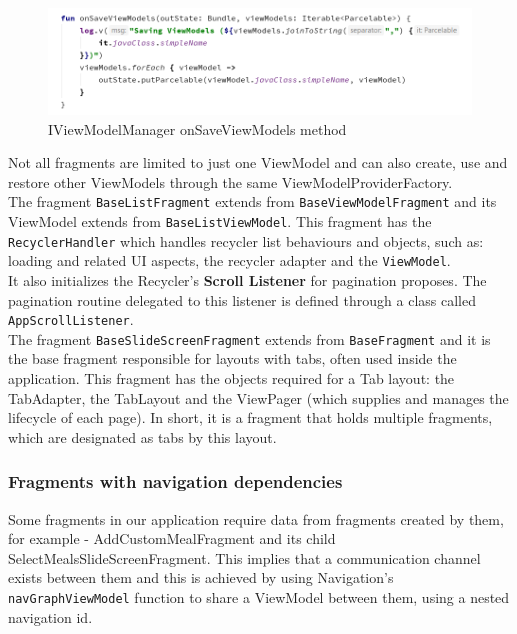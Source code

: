 \begin{figure}[H]
    \begin{center}
        \includegraphics[scale=0.5]{_figures/onSaveViewModelManager.png}
        \caption{IViewModelManager onSaveViewModels method}
    \end{center}
\end{figure}

Not all fragments are limited to just one ViewModel and can also create, use and restore other ViewModels through the same 
ViewModelProviderFactory.\\

The fragment \texttt{BaseListFragment} extends from \texttt{BaseViewModelFragment} and its ViewModel extends from \texttt{BaseListViewModel}.
This fragment has the \texttt{RecyclerHandler} which handles recycler list behaviours and objects, such as: loading and related UI aspects,
the recycler adapter and the \texttt{ViewModel}.\\

It also initializes the Recycler's \textbf{Scroll Listener} for pagination proposes. The pagination routine delegated to this listener is defined 
through a class called \texttt{AppScrollListener}.\\

The fragment \texttt{BaseSlideScreenFragment} extends from \texttt{BaseFragment} and it is the base fragment responsible for layouts with tabs, often
used inside the application. This fragment has the objects required for a Tab layout: the TabAdapter, the TabLayout and the ViewPager (which
supplies and manages the lifecycle of each page). In short, it is a fragment that holds multiple fragments, 
which are designated as tabs by this layout.\\

\subsubsection{Fragments with navigation dependencies}

Some fragments in our application require data from fragments created by them, for example - 
AddCustomMealFragment and its child SelectMealsSlideScreenFragment. 
This implies that a communication channel exists between
them and this is achieved by using Navigation's \texttt{navGraphViewModel}\cite{navgraph} function to share a ViewModel between them,
using a nested navigation id\cite{nestedNav}.\\

